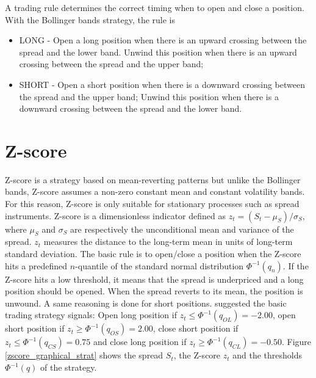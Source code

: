 \documentclass[11pt,a4,twosided,singlespacing,titlepagenumber=on]{scrreprt}
\numberwithin{equation}{chapter} %
\theoremstyle{remark}
\begin{document}
A trading rule determines the correct timing when to open and close a position. With the Bollinger bands strategy, the rule is

\begin{itemize}
\item LONG - Open a long position when there is an upward crossing between the spread and the lower band. Unwind this position when there is an upward crossing between the spread and the upper band;
\item SHORT - Open a short position when there is a downward crossing between the spread and the upper band; Unwind this position when there is a downward crossing between the spread and the lower band.
\end{itemize}

\section{Z-score}
Z-score is a strategy based on mean-reverting patterns but unlike the Bollinger bands, Z-score assumes a non-zero constant mean and constant volatility bands. For this reason, Z-score is only suitable for stationary processes such as spread instruments. Z-score is a dimensionless indicator defined as $z_t = (S_t-\mu_S) / \sigma_S$, where $\mu_S$ and $\sigma_S$ are respectively the unconditional mean and variance of the spread. $z_t$ measures the distance to the long-term mean in units of long-term standard deviation. The basic rule is to open/close a position when the Z-score hits a predefined $n$-quantile of the standard normal distribution $\Phi^{-1}(q_n)$. If the Z-score hits a low threshold, it means that the spread is underpriced and a long position should be opened. When the spread reverts to its mean, the position is unwound. A same reasoning is done for short positions. \cite{caldeira2013} suggested the basic trading strategy signals: Open long position if $z_t \leq \Phi^{-1}(q_{OL}) = -2.00$, open short position if $z_t \geq \Phi^{-1}(q_{OS}) = 2.00$, close short position if $z_t \leq \Phi^{-1}(q_{CS}) = 0.75$ and close long position if $z_t \geq \Phi^{-1}(q_{CL}) = -0.50$. Figure \ref{zscore_graphical_strat} shows the spread $S_t$, the Z-score $z_t$ and the thresholds $\Phi^{-1}(q)$ of the strategy.
\end{document}
